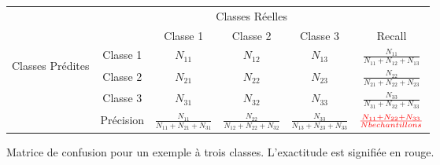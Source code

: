 \begin{figure*}
\caption{Matrice de confusion pour un exemple à trois classes. L'exactitude est signifiée en rouge.}
\label{ConfMat}
\begin{center}
\renewcommand{\arraystretch}{3}
\begin{tabular}{|c|c|c|c|c|c|}
\hline
 \multicolumn{2}{|c|}{\multirow{2}{*}{}} & \multicolumn{3}{|c}{Classes Réelles} &  \\
 \cline{3-6}
  \multicolumn{2}{|c|}{} & Classe 1 & Classe 2 & Classe 3 & Recall\\
  \hline
 \multirow{3}{*}{\begin{turn}{90} Classes Prédites\end{turn}} & Classe 1 & $N_{11}$ & $N_{12}$ & $N_{13}$ & $\frac{N_{11}}{N_{11} + N_{12} + N_{13} }$\\
 \cline{2-6}
  & Classe 2 & $N_{21}$ & $N_{22}$ & $N_{23}$ & $\frac{N_{22}}{N_{21} + N_{22} + N_{23} }$\\
  \cline{2-6}
  & Classe 3 & $N_{31}$ & $N_{32}$ & $N_{33}$ & $\frac{N_{33}}{N_{31} + N_{32} + N_{33} }$\\
  \cline{2-6}
  & Précision  & $\frac{N_{11}}{N_{11} + N_{21} + N_{31} }$ & $\frac{N_{22}}{N_{12} + N_{22} + N_{32} }$ & $\frac{N_{33}}{N_{13} + N_{23} + N_{33} }$ & $\textcolor{red}{\frac{N_{11} + N_{22} + N_{33}}{Nb echantillons}}$ \\
\hline

\end{tabular}
\end{center}
\end{figure*}
